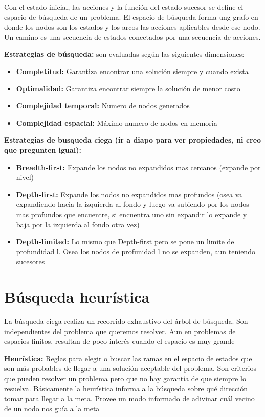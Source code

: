 Con el estado inicial, las acciones y la función del estado sucesor se define el espacio de búsqueda de un problema. El espacio de búsqueda forma ung grafo en donde los nodos son los estados y los arcos las acciones aplicables desde ese nodo. Un camino es una secuencia de estados conectados por una secuencia de acciones.

\textbf{Estrategias de búsqueda: }son evaluadas según las siguientes dimensiones:
\begin{itemize}
  \item \textbf{Completitud: }Garantiza encontrar una solución siempre y cuando exista
  \item \textbf{Optimalidad: }Garantiza encontrar siempre la solución de menor costo
  \item \textbf{Complejidad temporal: }Numero de nodos generados
  \item \textbf{Complejidad espacial: }Máximo numero de nodos en memoria
\end{itemize}

\textbf{Estrategias de busqueda ciega (ir a diapo para ver propiedades, ni creo que pregunten igual): }
\begin{itemize}
  \item \textbf{Breadth-first: }Expande los nodos no expandidos mas cercanos (expande por nivel)
  \item \textbf{Depth-first: }Expande los nodos no expandidos mas profundos (osea va expandiendo hacia la izquierda al fondo y luego va subiendo por los nodos mas profundos que encuentre, si encuentra uno sin expandir lo expande y baja por la izquierda al fondo otra vez)
  \item \textbf{Depth-limited: }Lo mismo que Depth-first pero se pone un limite de profundidad l. Osea los nodos de profunidad l no se expanden, aun teniendo sucesores
\end{itemize}

\section{Búsqueda heurística}
La búsqueda ciega realiza un recorrido exhaustivo del árbol de búsqueda. Son independientes del problema que queremos resolver. Aun en problemas de espacios finitos, resultan de poco interés cuando el espacio es muy grande 

\textbf{Heurística: }Reglas para elegir o buscar las ramas en el espacio de estados que son más probables de llegar a una solución aceptable del problema. Son criterios que pueden resolver un problema pero que no hay garantía de que siempre lo resuelva. Básicamente la heurística informa a la búsqueda sobre qué dirección tomar para llegar a la meta. Provee un modo informado de adivinar cuál vecino de un nodo nos guía a la meta

